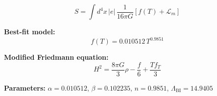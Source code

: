 
\begin{equation}
  S = \int d^4x \, |e| \, \frac{1}{16\pi G} \left[ f(T) + \mathcal{L}_m \right]
\end{equation}

\textbf{Best-fit model:}
\begin{equation}
  f(T) = 0.010512 \, T^{0.9851}
\end{equation}

\textbf{Modified Friedmann equation:}
\begin{equation}
  H^2 = \frac{8\pi G}{3} \rho - \frac{f}{6} + \frac{T f_T}{3}
\end{equation}

\textbf{Parameters:}
$\alpha = 0.010512$, \quad
$\beta = 0.102235$, \quad
$n = 0.9851$, \quad
$\Lambda_{\text{BI}} = 14.9405$